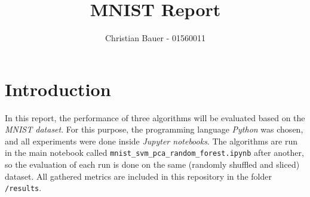 \documentclass{article}[12pt]
\title{MNIST Report}
\author{Christian Bauer - 01560011}
\date{}
\theoremstyle{mydef}
\begin{document}
\maketitle

\tableofcontents
\listoffigures

\pagebreak

    \section{Introduction}
    \label{sec: introduction}

        In this report, the performance of three algorithms will be evaluated based on the \emph{MNIST dataset}.
        For this purpose, the programming language \emph{Python} was chosen, 
        and all experiments were done inside \emph{Jupyter notebooks}.
        The algorithms are run in the main notebook called \texttt{mnist\_svm\_pca\_random\_forest.ipynb} after another, 
        so the evaluation of each run is done on the same (randomly shuffled and sliced) dataset.
        All gathered metrics are included in this repository in the folder \texttt{/results}.
              




                    
\end{document}
